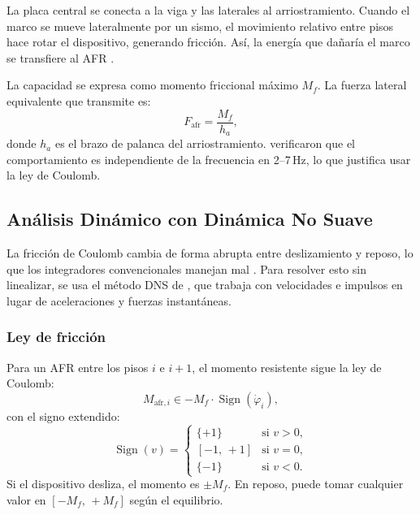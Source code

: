 \documentclass[preprint,12pt,authoryear]{elsarticle}
\newcommand{\Mf}{M_{\!f}}
\newcommand{\ha}{h_a}
\begin{document}
La placa central se conecta a la viga y las laterales al arriostramiento. Cuando
el marco se mueve lateralmente por un sismo, el movimiento relativo entre pisos
hace rotar el dispositivo, generando fricción. Así, la energía que dañaría el
marco se transfiere al AFR \citep{kim_use_2011}.

La capacidad se expresa como momento friccional máximo $\Mf$. La fuerza lateral
equivalente que transmite es:
\begin{equation}
    F_{\mathrm{afr}} = \frac{\Mf}{\ha},
    \label{eq:Fafr}
\end{equation}
donde $\ha$ es el brazo de palanca del arriostramiento. \citet{Mualla2002}
verificaron que el comportamiento es independiente de la frecuencia en 2--7\,Hz,
lo que justifica usar la ley de Coulomb.

\subsection{Análisis Dinámico con Dinámica No Suave}
\label{sec:theory:dns}

La fricción de Coulomb cambia de forma abrupta entre deslizamiento y reposo,
lo que los integradores convencionales manejan mal \citep{chopra_dynamics_2015}.
Para resolver esto sin linealizar, se usa el método DNS de \citet{Namorado2024},
que trabaja con velocidades e impulsos en lugar de aceleraciones y fuerzas
instantáneas.

\subsubsection*{Ley de fricción}

Para un AFR entre los pisos $i$ e $i+1$, el momento resistente sigue la ley de
Coulomb:
\begin{equation}
    M_{\mathrm{afr},i} \in -\Mf \cdot \operatorname{Sign}\!\left(\dot{\varphi}_i\right),
    \label{eq:coulomb}
\end{equation}
con el signo extendido:
\begin{equation}
    \operatorname{Sign}(v) =
    \begin{cases}
        \{+1\}    & \text{si } v > 0, \\
        [-1,\,+1] & \text{si } v = 0, \\
        \{-1\}    & \text{si } v < 0.
    \end{cases}
    \label{eq:sign}
\end{equation}
Si el dispositivo desliza, el momento es $\pm\Mf$. En reposo, puede tomar
cualquier valor en $[-\Mf,\,+\Mf]$ según el equilibrio.
\end{document}
